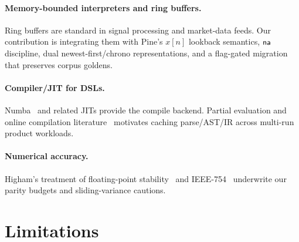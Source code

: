 \documentclass[11pt,a4paper]{article}
\begin{document}
\paragraph{Memory-bounded interpreters and ring buffers.}
Ring buffers are standard in signal processing and market-data feeds.  Our
contribution is integrating them with Pine's $x[n]$ lookback semantics, $\textsf{na}$
discipline, dual newest-first/chrono representations, and a flag-gated
migration that preserves corpus goldens.

\paragraph{Compiler/JIT for DSLs.}
Numba~\citep{lam2015numba} and related JITs provide the compile backend.
Partial evaluation and online compilation literature~\citep{jones1993partial}
motivates caching parse/AST/IR across multi-run product workloads.

\paragraph{Numerical accuracy.}
Higham's treatment of floating-point stability~\citep{higham2002accuracy} and
IEEE-754~\citep{ieee754} underwrite our parity budgets and sliding-variance
cautions.

\section{Limitations}
\label{sec:limits}
\end{document}
